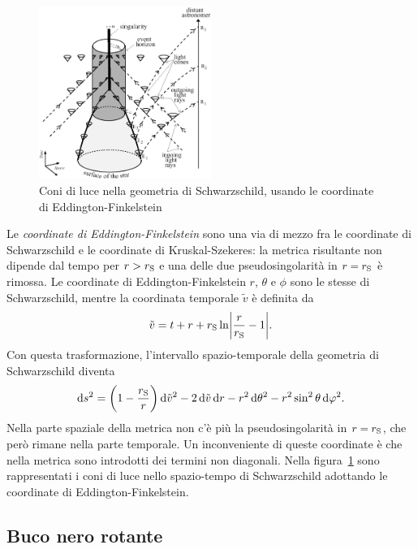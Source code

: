 \begin{figure}
  \centering
  \includegraphics[width=0.5\textwidth]{figure/eddington}
  \caption{Coni di luce nella geometria di Schwarzschild, usando le coordinate
    di Eddington-Finkelstein}
  \label{fig:coni-eddington}
\end{figure}
Le \emph{coordinate di
  Eddington-Finkelstein} sono una via di mezzo fra le coordinate di
Schwarzschild e le coordinate di Kruskal-Szekeres: la metrica risultante non
dipende dal tempo per \(r > r_{\textup{S}}\) e una delle due pseudosingolarità
in \(r = r_{\textup{S}}\) è rimossa.  Le coordinate di Eddington-Finkelstein
\(r\), \(\theta\) e \(\phi\) sono le stesse di Schwarzschild, mentre la
coordinata temporale \(\tilde{v}\) è definita
da~\parencites{1924Natur.113..192E}{1958PhRv..110..965F}
\begin{equation}
  \tilde{v} = t + r + r_{\textup{S}} \ln\abs*{\frac{r}{r_{\textup{S}}} - 1}.
\end{equation}
Con questa trasformazione, l'intervallo spazio-temporale della geometria di
Schwarzschild diventa
\begin{equation}
  \mathop{}\!\mathrm{d} s^{2} = \biggl(1 - \frac{r_{\textup{S}}}{r}\biggr)\mathop{}\!\mathrm{d}\tilde{v}^{2} -
  2\mathop{}\!\mathrm{d}\tilde{v}\mathop{}\!\mathrm{d} r - r^{2}\mathop{}\!\mathrm{d}\theta^{2} - r^{2}\sin^{2}\theta\mathop{}\!\mathrm{d}\varphi^{2}.
\end{equation}
Nella parte spaziale della metrica non c'è più la pseudosingolarità in \(r =
r_{\textup{S}}\), che però rimane nella parte temporale.  Un inconveniente di
queste coordinate è che nella metrica sono introdotti dei termini non diagonali.
Nella figura~\ref{fig:coni-eddington} sono rappresentati i coni di luce nello
spazio-tempo di Schwarzschild adottando le coordinate di Eddington-Finkelstein.

\subsection{Buco nero rotante}
\label{sec:singolarita-kerr}

